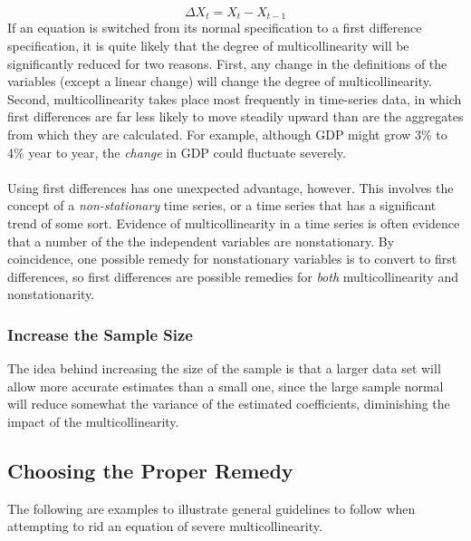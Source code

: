 \documentclass[11pt]{article}
\begin{document}
$$
\Delta X_t = X_t - X_{t-1}
$$
If an equation is switched from its normal specification to a first difference specification, it is quite likely that the degree of multicollinearity will be significantly reduced for two reasons. First, any change in the definitions of the variables (except a linear change) will change the degree of multicollinearity. Second, multicollinearity takes place most frequently in time-series data, in which first differences are far less likely to move steadily upward than are the aggregates from which they are calculated. For example, although GDP might grow 3\% to 4\% year to year, the \textit{change} in GDP could fluctuate severely.\\ \\
Using first differences has one unexpected advantage, however. This involves the concept of a \textit{non-stationary} time series, or a time series that has a significant trend of some sort. Evidence of multicollinearity in a time series is often evidence that a number of the the independent variables are nonstationary. By coincidence, one possible  remedy for nonstationary variables is to convert to first differences, so first differences are possible remedies for \textit{both} multicollinearity and nonstationarity. 
\subsubsection{Increase the Sample Size}
The idea behind increasing the size of the sample is that a larger data set will allow more accurate estimates than a small one, since the large sample normal will reduce somewhat the variance of the estimated coefficients, diminishing the impact of the multicollinearity.
\subsection{Choosing the Proper Remedy}
The following are examples to illustrate general guidelines to follow when attempting to rid an equation of severe multicollinearity.
\end{document}
